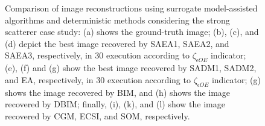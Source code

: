 \begin{figure}[!h]
				\caption[Strong scatterer case study: Comparison of image reconstructions using surrogate model-assisted algorithms and deterministic methods.]{Comparison of image reconstructions using surrogate model-assisted algorithms and deterministic methods considering the strong scatterer case study: (a) shows the ground-truth image; (b), (c), and (d) depict the best image recovered by SAEA1, SAEA2, and SAEA3, respectively, in 30 execution according to $\zeta_{\epsilon OE}$ indicator; (e), (f) and (g) show the best image recovered by SADM1, SADM2, and EA, respectively, in 30 execution according to $\zeta_{\epsilon OE}$ indicator; (g) shows the image recovered by BIM, and (h) shows the image recovered by DBIM; finally, (i), (k), and (l) show the image recovered by CGM, ECSI, and SOM, respectively.}
				\label{fig:results:casestudy:strong:reconstruction}
			\end{figure}
		
			
